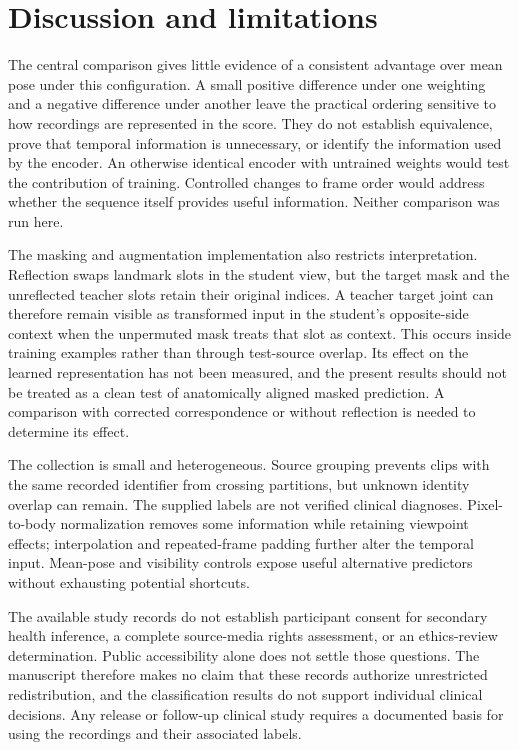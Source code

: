 \documentclass[10pt,twocolumn,letterpaper]{article}
\begin{document}
\section{Discussion and limitations}
The central comparison gives little evidence of a consistent advantage over mean pose under this configuration. A small positive difference under one weighting and a negative difference under another leave the practical ordering sensitive to how recordings are represented in the score. They do not establish equivalence, prove that temporal information is unnecessary, or identify the information used by the encoder. An otherwise identical encoder with untrained weights would test the contribution of training. Controlled changes to frame order would address whether the sequence itself provides useful information. Neither comparison was run here.

The masking and augmentation implementation also restricts interpretation. Reflection swaps landmark slots in the student view, but the target mask and the unreflected teacher slots retain their original indices. A teacher target joint can therefore remain visible as transformed input in the student's opposite-side context when the unpermuted mask treats that slot as context. This occurs inside training examples rather than through test-source overlap. Its effect on the learned representation has not been measured, and the present results should not be treated as a clean test of anatomically aligned masked prediction. A comparison with corrected correspondence or without reflection is needed to determine its effect.

The collection is small and heterogeneous. Source grouping prevents clips with the same recorded identifier from crossing partitions, but unknown identity overlap can remain. The supplied labels are not verified clinical diagnoses. Pixel-to-body normalization removes some information while retaining viewpoint effects; interpolation and repeated-frame padding further alter the temporal input. Mean-pose and visibility controls expose useful alternative predictors without exhausting potential shortcuts.

The available study records do not establish participant consent for secondary health inference, a complete source-media rights assessment, or an ethics-review determination. Public accessibility alone does not settle those questions. The manuscript therefore makes no claim that these records authorize unrestricted redistribution, and the classification results do not support individual clinical decisions. Any release or follow-up clinical study requires a documented basis for using the recordings and their associated labels.
\end{document}
